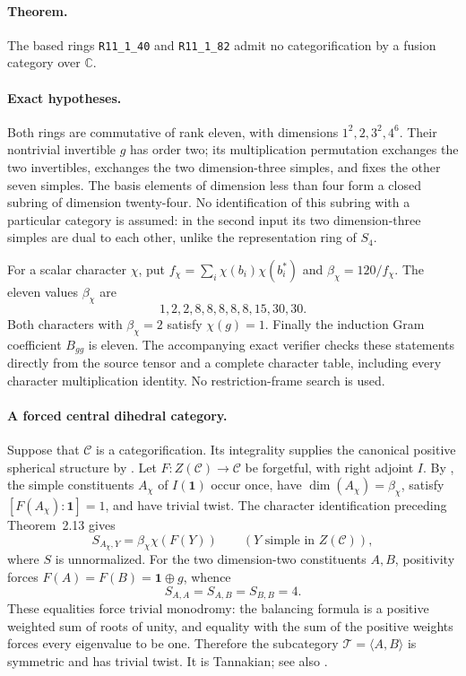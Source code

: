 \documentclass[11pt,a4paper]{article}
\begin{document}
\paragraph{Theorem.}
The based rings \texttt{R11\_1\_40} and \texttt{R11\_1\_82} admit no
categorification by a fusion category over $\mathbb C$.

\paragraph{Exact hypotheses.}
Both rings are commutative of rank eleven, with dimensions
$1^2,2,3^2,4^6$. Their nontrivial invertible $g$ has order two;
its multiplication permutation exchanges the two invertibles, exchanges
the two dimension-three simples, and fixes the other seven simples.
The basis elements of dimension less than four form a closed subring
of dimension twenty-four. No identification of this subring with a
particular category is assumed: in the second input its two dimension-three
simples are dual to each other, unlike the representation ring of $S_4$.

For a scalar character $\chi$, put
$f_\chi=\sum_i\chi(b_i)\chi(b_i^*)$ and $\beta_\chi=120/f_\chi$.
The eleven values $\beta_\chi$ are
\[
 1,2,2,8,8,8,8,8,15,30,30.
\]
Both characters with $\beta_\chi=2$ satisfy $\chi(g)=1$.
Finally the induction Gram coefficient $B_{gg}$ is eleven.
The accompanying exact verifier checks these statements directly from
the source tensor and a complete character table, including every
character multiplication identity. No restriction-frame search is used.

\paragraph{A forced central dihedral category.}
Suppose that $\mathcal C$ is a categorification. Its integrality supplies
the canonical positive spherical structure by
\cite[Proposition~8.24]{ENO}. Let $F:Z(\mathcal C)\to\mathcal C$ be
forgetful, with right adjoint $I$. By \cite[Theorems~2.5 and~2.13]{OstrikPivotal},
the simple constituents $A_\chi$ of $I(\mathbf1)$ occur once, have
$\dim(A_\chi)=\beta_\chi$, satisfy $[F(A_\chi):\mathbf1]=1$, and have
trivial twist. The character identification preceding Theorem~2.13 gives
\[
 S_{A_\chi,Y}=\beta_\chi\chi(F(Y))
 \qquad(Y\text{ simple in }Z(\mathcal C)),
\]
where $S$ is unnormalized. For the two dimension-two constituents $A,B$,
positivity forces $F(A)=F(B)=\mathbf1\oplus g$, whence
\[
 S_{A,A}=S_{A,B}=S_{B,B}=4.
\]
These equalities force trivial monodromy: the balancing formula is a
positive weighted sum of roots of unity, and equality with the sum of
the positive weights forces every eigenvalue to be one. Therefore the
subcategory $\mathcal T=\langle A,B\rangle$ is symmetric and has trivial
twist. It is Tannakian; see also \cite{DGNO}.
\end{document}
